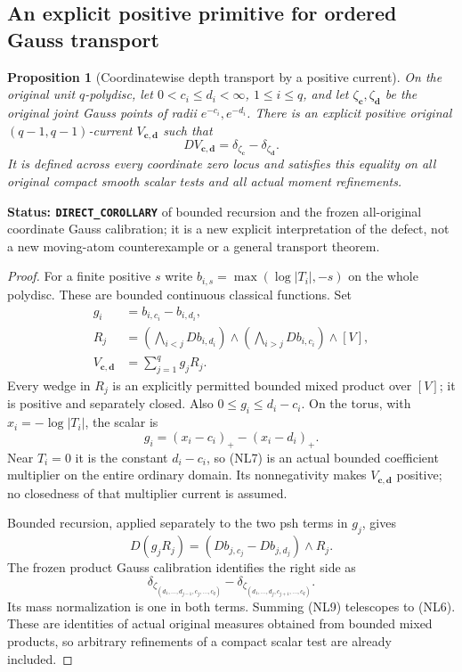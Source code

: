 \documentclass[11pt,a4paper]{article}
\numberwithin{equation}{section}
\newtheorem{proposition}[theorem]{Proposition}
\theoremstyle{definition}
\theoremstyle{remark}
\begin{document}
\subsection{An explicit positive primitive for ordered Gauss transport}

\begin{proposition}[Coordinatewise depth transport by a positive current]
\label{prop:r12-positive-gauss-transport}
On the original unit $q$-polydisc, let
$0<c_i\leq d_i<\infty$, $1\leq i\leq q$, and let
$\zeta_{\mathbf c},\zeta_{\mathbf d}$ be the original joint
Gauss points of radii $e^{-c_i},e^{-d_i}$.  There is an explicit
positive original $(q-1,q-1)$-current $V_{\mathbf c,\mathbf d}$
such that
\[
                 D V_{\mathbf c,\mathbf d}
                        =\delta_{\zeta_{\mathbf c}}
                              -\delta_{\zeta_{\mathbf d}}.
 \tag{NL6}
\]
It is defined across every coordinate zero locus and satisfies
this equality on all original compact smooth scalar tests and
all actual moment refinements.
\end{proposition}

\noindent\textbf{Status: \texttt{DIRECT\_COROLLARY}} of bounded
recursion and the frozen all-original coordinate Gauss calibration;
it is a new explicit interpretation of the defect, not a new
moving-atom counterexample or a general transport theorem.

\begin{proof}
For a finite positive $s$ write
$b_{i,s}=\max(\log|T_i|,-s)$ on the whole polydisc.
These are bounded continuous classical functions.  Set
\[
 \begin{split}
 g_i&=b_{i,c_i}-b_{i,d_i},\\
 R_j&=\left(\bigwedge_{i<j}Db_{i,d_i}\right)
          \wedge\left(\bigwedge_{i>j}Db_{i,c_i}\right)\wedge[V],\\
 V_{\mathbf c,\mathbf d}&=\sum_{j=1}^q g_jR_j.
 \end{split}
 \tag{NL7}
\]
Every wedge in $R_j$ is an explicitly permitted bounded mixed
product over $[V]$; it is positive and separately closed.
Also $0\leq g_i\leq d_i-c_i$.  On the torus, with
$x_i=-\log|T_i|$, the scalar is
\[
              g_i=(x_i-c_i)_+-(x_i-d_i)_+.
 \tag{NL8}
\]
Near $T_i=0$ it is the constant $d_i-c_i$, so (NL7) is an
actual bounded coefficient multiplier on the entire ordinary
domain.  Its nonnegativity makes $V_{\mathbf c,\mathbf d}$
positive; no closedness of that multiplier current is assumed.

Bounded recursion, applied separately to the two psh terms in
$g_j$, gives
\[
 D(g_jR_j)=(Db_{j,c_j}-Db_{j,d_j})\wedge R_j.
\]
The frozen product Gauss calibration identifies the right side as
\[
 \delta_{\zeta_{(d_1,\ldots,d_{j-1},c_j,\ldots,c_q)}}
 -\delta_{\zeta_{(d_1,\ldots,d_j,c_{j+1},\ldots,c_q)}}.
 \tag{NL9}
\]
Its mass normalization is one in both terms.  Summing (NL9)
telescopes to (NL6).  These are identities of actual original
measures obtained from bounded mixed products, so arbitrary
refinements of a compact scalar test are already included.
\end{proof}
\end{document}
